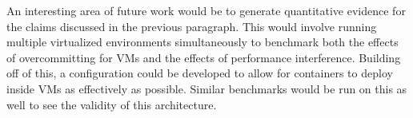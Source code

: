 \documentclass{sig-alternate-10pt}
\begin{document}
An interesting area of future work would be to generate quantitative evidence for the claims discussed in the previous paragraph. This would involve running multiple virtualized environments simultaneously to benchmark both the effects of overcommitting for VMs and the effects of performance interference. Building off of this, a configuration could be developed to allow for containers to deploy inside VMs as effectively as possible. Similar benchmarks would be run on this as well to see the validity of this architecture.



%


\end{document}
